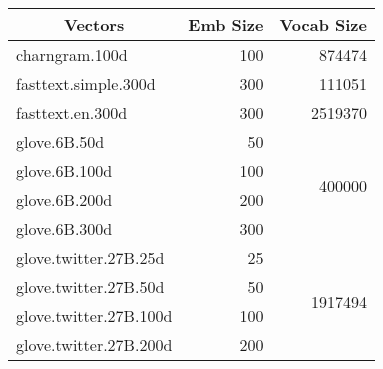 \begin{tabular}{| l | r | r |}
    \hline
    
    \multicolumn{1}{|c|}{\textbf{Vectors}} &
    \multicolumn{1}{|c|}{\textbf{Emb Size}} &
    \multicolumn{1}{|c|}{\textbf{Vocab Size}} \\
    
    \hline \hline
    
    charngram.100d & 100 & \num{874474} \\
    
    \hline
    
    fasttext.simple.300d & 300 & \num{111051} \\
    
    \hline
    
    fasttext.en.300d & 300 & \num{2519370} \\
    
    \hline
    
    glove.6B.50d  &  50 & \multirow{4}{*}{\num{400000}} \\ %
    glove.6B.100d & 100 &                               \\ %
    glove.6B.200d & 200 &                               \\ %
    glove.6B.300d & 300 &                               \\ %
    
    \hline
    
    glove.twitter.27B.25d  &  25 & \multirow{4}{*}{\num{1917494}} \\ %
    glove.twitter.27B.50d  &  50 &                                \\ %
    glove.twitter.27B.100d & 100 &                                \\ %
    glove.twitter.27B.200d & 200 &                                \\ %
    

\end{tabular}
